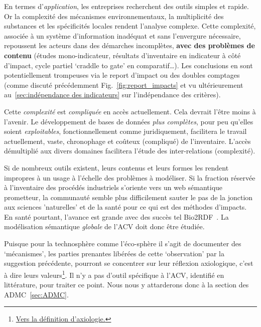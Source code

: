 En termes d’\emph{application}, les entreprises recherchent des outils simples et rapide.
Or la complexité des mécanismes environnementaux, la multiplicité des substances et les spécificités locales rendent l’analyse complexe.
Cette complexité, associée à un système d'information inadéquat et sans l'envergure nécessaire, repoussent les acteurs dans des démarches incomplètes, \textbf{avec des problèmes de contenu} (études mono-indicateur, résultats d’inventaire en indicateur à côté d’impact, cycle partiel `craddle to gate' en comparatif\ldots).
Les conclusions en sont potentiellement trompeuses via le report d'impact ou des doubles comptages (comme discuté précédemment Fig.~\ref{fig:report_impacts} et vu ultérieurement au~\ref{sec:indépendance des indicateurs} sur l'indépendance des critères).
    
Cette \textit{complexité} est \textit{compliquée} en accès actuellement.
Cela devrait l'être moins à l'avenir.
Le développement de bases de données \emph{plus complètes}, pour peu qu'elles soient \emph{exploitables}, fonctionnellement comme juridiquement, facilitera le travail actuellement, vaste, chronophage et coûteux (compliqué) de l'inventaire.
L'accès démultiplié aux divers domaines facilitera l'étude des inter-relations (complexité).

Si de nombreux outils existent, leurs contenus et leurs formes les rendent impropres à un usage à l'échelle des problèmes à modéliser.
Si la fraction réservée à l'inventaire des procédés industriels s'oriente vers un web sémantique prometteur, la communauté semble plus difficilement sauter le pas de la jonction aux sciences 'naturelles' et de la santé pour ce qui est des méthodes d'impacts.
En santé pourtant, l'avance est grande avec des succès tel Bio2RDF~\cite{belleau_bio2rdf:_2008}.
La modélisation sémantique \emph{globale} de l'ACV doit donc être étudiée.

Puisque pour la technosphère comme l'éco-sphère il s'agit de documenter des `mécanismes', les parties prenantes libérées de cette `observation' par la suggestion précédente, pourront se concentrer sur leur réflexion axiologique, c'est à dire leurs valeurs\footnote{\href{http://www.cnrtl.fr/definition/axiologie}{Vers la définition d'axiologie.}}.
Il n'y a pas d'outil spécifique à l'ACV, identifié en littérature, pour traiter ce point.
Nous nous y attarderons donc à la section des \gls{ADMC}~\ref{sec:ADMC}.

